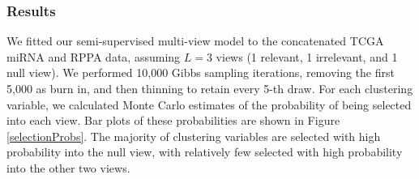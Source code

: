 \documentclass[12pt]{article}
\begin{document}
%    
%




\subsubsection{Results}\label{brcaResults}
We fitted our semi-supervised multi-view model to the concatenated TCGA miRNA and RPPA data, assuming $L = 3$ views (1 relevant, 1 irrelevant, and 1 null view).  We performed 10,000 Gibbs sampling iterations, removing the first 5,000 as burn in, and then thinning to retain every 5-th draw.  For each clustering variable, we calculated Monte Carlo estimates of the probability of being selected into each view.  Bar plots of these probabilities are shown in Figure \ref{selectionProbs}.  The majority of clustering variables are selected with high probability into the null view, with relatively few selected with high probability into the other two views.      
\end{document}
